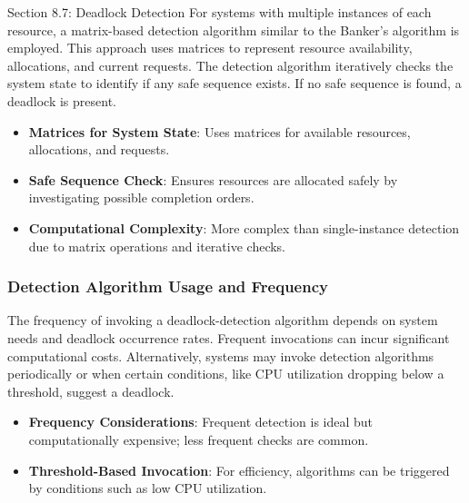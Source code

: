 \begin{notes}{Section 8.7: Deadlock Detection}
    For systems with multiple instances of each resource, a matrix-based detection algorithm similar to the Banker's algorithm is employed. This approach uses matrices to represent resource availability, 
    allocations, and current requests. The detection algorithm iteratively checks the system state to identify if any safe sequence exists. If no safe sequence is found, a deadlock is present.
    
    \begin{highlight}
    
        \begin{itemize}
            \item \textbf{Matrices for System State}: Uses matrices for available resources, allocations, and requests.
            \item \textbf{Safe Sequence Check}: Ensures resources are allocated safely by investigating possible completion orders.
            \item \textbf{Computational Complexity}: More complex than single-instance detection due to matrix operations and iterative checks.
        \end{itemize}
    
    \end{highlight}
    
    \subsubsection*{Detection Algorithm Usage and Frequency}
    
    The frequency of invoking a deadlock-detection algorithm depends on system needs and deadlock occurrence rates. Frequent invocations can incur significant computational costs. Alternatively, systems 
    may invoke detection algorithms periodically or when certain conditions, like CPU utilization dropping below a threshold, suggest a deadlock.
    
    \begin{highlight}
    
        \begin{itemize}
            \item \textbf{Frequency Considerations}: Frequent detection is ideal but computationally expensive; less frequent checks are common.
            \item \textbf{Threshold-Based Invocation}: For efficiency, algorithms can be triggered by conditions such as low CPU utilization.
        \end{itemize}
    

\end{highlight}
\end{notes}
